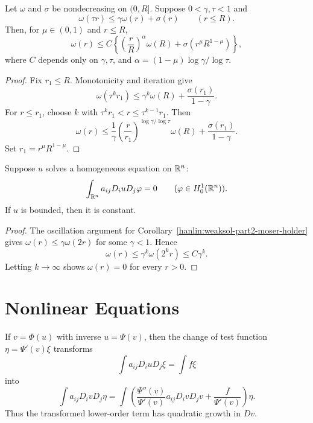 \begin{lemma}\label{hanlin:weaksol-part2-oscillation-iteration}
Let $\omega$ and $\sigma$ be nondecreasing on $(0,R]$. Suppose
$0<\gamma,\tau<1$ and
\[
\omega(\tau r)\leq\gamma\omega(r)+\sigma(r)
\qquad(r\leq R).
\]
Then, for $\mu\in(0,1)$ and $r\leq R$,
\[
\omega(r)\leq C\left\{
\left(\frac rR\right)^\alpha\omega(R)
+\sigma(r^\mu R^{1-\mu})\right\},
\]
where $C$ depends only on $\gamma,\tau$, and
$\alpha=(1-\mu)\log\gamma/\log\tau$.
\end{lemma}
\begin{proof}
\sketch Fix $r_1\leq R$. Monotonicity and iteration give
\[
\omega(\tau^kr_1)
\leq\gamma^k\omega(R)+\frac{\sigma(r_1)}{1-\gamma}.
\]
For $r\leq r_1$, choose $k$ with
$\tau^kr_1<r\leq\tau^{k-1}r_1$. Then
\[
\omega(r)\leq\frac1\gamma
\left(\frac r{r_1}\right)^{\log\gamma/\log\tau}\omega(R)
+\frac{\sigma(r_1)}{1-\gamma}.
\]
Set $r_1=r^\mu R^{1-\mu}$.
\end{proof}

\begin{corollary}\label{hanlin:weaksol-part2-liouville}
Suppose $u$ solves a homogeneous equation on $\mathbb{R}^n$:
\[
\int_{\mathbb{R}^n}a_{ij}D_i uD_j\varphi=0
\qquad(\varphi\in H^1_0(\mathbb{R}^n)).
\]
If $u$ is bounded, then it is constant.
\end{corollary}
\begin{proof}
\sketch The oscillation argument for
Corollary~\ref{hanlin:weaksol-part2-moser-holder} gives
$\omega(r)\leq\gamma\omega(2r)$ for some $\gamma<1$. Hence
\[
\omega(r)\leq\gamma^k\omega(2^kr)\leq C\gamma^k.
\]
Letting $k\to\infty$ shows $\omega(r)=0$ for every $r>0$.
\end{proof}

\section{Nonlinear Equations}

If $v=\Phi(u)$ with inverse $u=\Psi(v)$, then the change of test function
$\eta=\Psi'(v)\xi$ transforms
\[
\int a_{ij}D_i uD_j\xi=\int f\xi
\]
into
\[
\int a_{ij}D_i vD_j\eta
=\int\left(
\frac{\Psi''(v)}{\Psi'(v)}a_{ij}D_i vD_j v
+\frac{f}{\Psi'(v)}\right)\eta.
\]
Thus the transformed lower-order term has quadratic growth in $Dv$.

